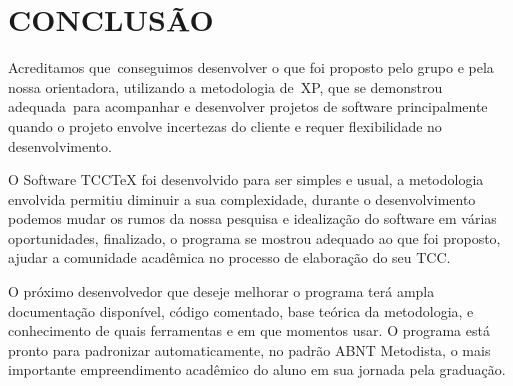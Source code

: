 \chapter{CONCLUS\~AO}

\bigskip

{
Acreditamos que\ conseguimos desenvolver o que foi proposto pelo grupo e pela nossa orientadora, utilizando a
metodologia de\ XP, que se demonstrou adequada\ para acompanhar e desenvolver projetos de software principalmente
quando o projeto envolve incertezas do cliente e requer flexibilidade no desenvolvimento.}

{
O Software TCCTeX foi desenvolvido para ser simples e usual, a metodologia envolvida permitiu diminuir a sua
complexidade, durante o desenvolvimento podemos mudar os rumos da nossa pesquisa e idealiza\c{c}\~ao do software em
v\'arias oportunidades, finalizado, o programa se mostrou adequado ao que foi proposto, ajudar a comunidade acad\^emica
no processo de elabora\c{c}\~ao do seu TCC.}

{
O pr\'oximo desenvolvedor que deseje melhorar o programa ter\'a ampla documenta\c{c}\~ao dispon\'ivel, c\'odigo
comentado, base te\'orica da metodologia, e conhecimento de quais ferramentas e em que momentos usar. O programa est\'a
pronto para padronizar automaticamente, no padr\~ao ABNT Metodista, o mais importante empreendimento acad\^emico do
aluno em sua jornada pela gradua\c{c}\~ao.}


\bigskip

